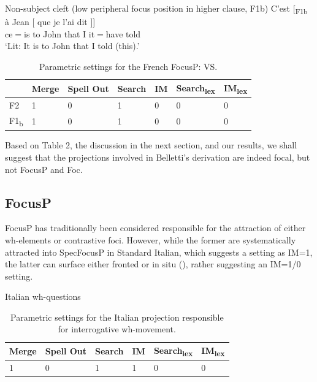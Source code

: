 \documentclass[fleqn,10pt]{wlscirep}
\begin{document}
\begin{exe}
    \ex	Non-subject cleft (low peripheral focus position in higher clause, F1b)
        \gll {[} C'est {[}\textsubscript{F1b} à Jean {[} que je l'ai dit {]]}\\
        {} ce$=$is 		{}	to John			{}		that I it$=$have told {} \\
        \vspace*{-3mm}
        \glt ‘Lit: It is to John that I told (this).’
\end{exe}


\begin{table}[H]
    \centering
    \begin{tabular}{|l|l|l|l|l|l|l|}
    \hline
    & Merge & Spell Out & Search & IM & Search\textsubscript{lex} & IM\textsubscript{lex} \\
    \hline
    F2 & 1 & 0 & 1 & 0 & 0 & 0 \\
    \hline
    F1\textsubscript{b} & 1 & 0 & 1 & 0 & 0 & 0 \\
    \hline
    \end{tabular}
    \caption{\label{tab:belletti}Parametric settings for the French FocusP: VS.}
\end{table}

\noindent Based on Table 2, the discussion in the next section, and our results, we shall suggest that the projections involved in Belletti's derivation are indeed focal, but not FocusP and Foc.

\subsection*{FocusP}

FocusP has traditionally been considered responsible for the attraction of either wh-elements or contrastive foci. 
However, while the former are systematically attracted into SpecFocusP in Standard Italian, which suggests a setting as IM=1, the latter can surface either fronted or in situ (\citealt{bianchi2013}), rather suggesting an IM=1/0 setting. 

\begin{exe}
    \ex Italian wh-questions
\end{exe}

\begin{table}[H]
    \centering
    \begin{tabular}{|l|l|l|l|l|l|}
    \hline
    Merge & Spell Out & Search & IM & Search\textsubscript{lex} & IM\textsubscript{lex} \\
    \hline
    1 & 0 & 1 & 1 & 0 & 0 \\
    \hline
    \end{tabular}
    \caption{\label{tab:samp}Parametric settings for the Italian projection responsible for interrogative wh-movement.}
\end{table}
\end{document}
